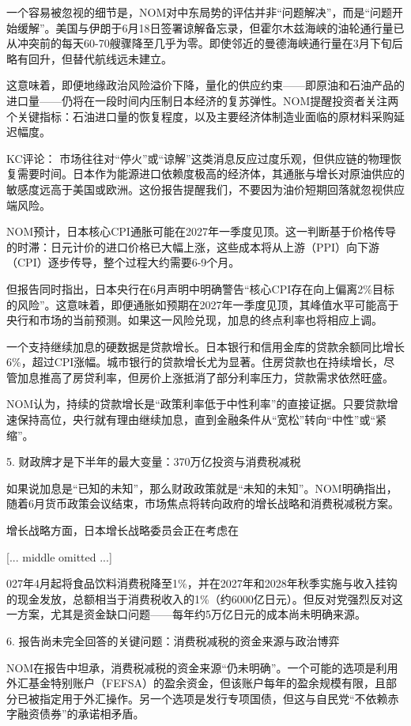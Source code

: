 \documentclass[11pt]{ctexart}
\begin{document}
一个容易被忽视的细节是，NOM对中东局势的评估并非“问题解决”，而是“问题开始缓解”。美国与伊朗于6月18日签署谅解备忘录，但霍尔木兹海峡的油轮通行量已从冲突前的每天60-70艘骤降至几乎为零。即使邻近的曼德海峡通行量在3月下旬后略有回升，但替代航线远未建立。

这意味着，即便地缘政治风险溢价下降，量化的供应约束——即原油和石油产品的进口量——仍将在一段时间内压制日本经济的复苏弹性。NOM提醒投资者关注两个关键指标：石油进口量的恢复程度，以及主要经济体制造业面临的原材料采购延迟幅度。

KC评论： 市场往往对“停火”或“谅解”这类消息反应过度乐观，但供应链的物理恢复需要时间。日本作为能源进口依赖度极高的经济体，其通胀与增长对原油供应的敏感度远高于美国或欧洲。这份报告提醒我们，不要因为油价短期回落就忽视供应端风险。

NOM预计，日本核心CPI通胀可能在2027年一季度见顶。这一判断基于价格传导的时滞：日元计价的进口价格已大幅上涨，这些成本将从上游（PPI）向下游（CPI）逐步传导，整个过程大约需要6-9个月。

但报告同时指出，日本央行在6月声明中明确警告“核心CPI存在向上偏离2\%目标的风险”。这意味着，即便通胀如预期在2027年一季度见顶，其峰值水平可能高于央行和市场的当前预测。如果这一风险兑现，加息的终点利率也将相应上调。

一个支持继续加息的硬数据是贷款增长。日本银行和信用金库的贷款余额同比增长6\%，超过CPI涨幅。城市银行的贷款增长尤为显著。住房贷款也在持续增长，尽管加息推高了房贷利率，但房价上涨抵消了部分利率压力，贷款需求依然旺盛。

NOM认为，持续的贷款增长是“政策利率低于中性利率”的直接证据。只要贷款增速保持高位，央行就有理由继续加息，直到金融条件从“宽松”转向“中性”或“紧缩”。

5. 财政牌才是下半年的最大变量：370万亿投资与消费税减税

如果说加息是“已知的未知”，那么财政政策就是“未知的未知”。NOM明确指出，随着6月货币政策会议结束，市场焦点将转向政府的增长战略和消费税减税方案。

增长战略方面，日本增长战略委员会正在考虑在

[... middle omitted ...]

027年4月起将食品饮料消费税降至1\%，并在2027年和2028年秋季实施与收入挂钩的现金发放，总额相当于消费税收入的1\%（约6000亿日元）。但反对党强烈反对这一方案，尤其是资金缺口问题——每年约5万亿日元的成本尚未明确来源。

6. 报告尚未完全回答的关键问题：消费税减税的资金来源与政治博弈

NOM在报告中坦承，消费税减税的资金来源“仍未明确”。一个可能的选项是利用外汇基金特别账户（FEFSA）的盈余资金，但该账户每年的盈余规模有限，且部分已被指定用于外汇操作。另一个选项是发行专项国债，但这与自民党“不依赖赤字融资债券”的承诺相矛盾。
\end{document}
